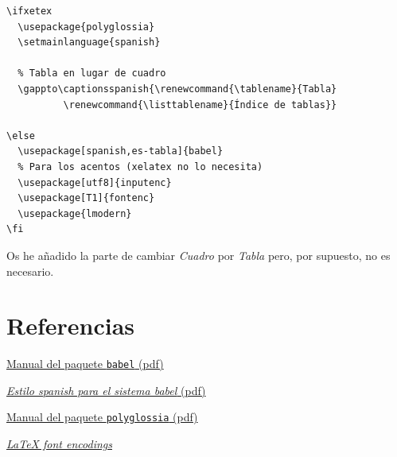 \begin{lstlisting}[language={[latex]tex}]
% Idioma
\ifxetex
  \usepackage{polyglossia}
  \setmainlanguage{spanish}

  % Tabla en lugar de cuadro
  \gappto\captionsspanish{\renewcommand{\tablename}{Tabla}  
          \renewcommand{\listtablename}{Índice de tablas}}

\else
  \usepackage[spanish,es-tabla]{babel}
  % Para los acentos (xelatex no lo necesita)
  \usepackage[utf8]{inputenc} 
  \usepackage[T1]{fontenc}
  \usepackage{lmodern}
\fi
\end{lstlisting}

Os he añadido la parte de cambiar \emph{Cuadro} por \emph{Tabla} pero, por supuesto,
no es necesario.

\section{Referencias}

\href{http://osl.ugr.es/CTAN/macros/latex/required/babel/base/babel.pdf}{Manual
del paquete \texttt{babel} (pdf)}

\href{http://tug.ctan.org/tex-archive/language/spanish/babel/base/spanish.pdf}{\emph{Estilo
spanish para el sistema babel} (pdf)}

\href{http://osl.ugr.es/CTAN/macros/latex/contrib/polyglossia/polyglossia.pdf}{Manual
del paquete \texttt{polyglossia} (pdf)}

\href{http://mirror.utexas.edu/ctan/macros/latex/doc/encguide.pdf}{\emph{LaTeX
font encodings}}

